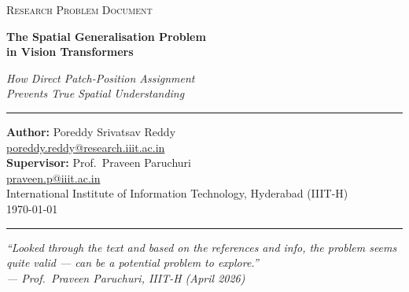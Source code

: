 \documentclass[12pt,a4paper]{article}
\begin{document}
\begin{titlepage}
  \centering
  \vspace*{1cm}
  {\small\scshape\color{gray} Research Problem Document\par}
  \vspace{0.6cm}
  {\LARGE\bfseries\color{navyblue}
    The Spatial Generalisation Problem\\[6pt]
    in Vision Transformers\par}
  \vspace{0.5cm}
  {\large\itshape\color{midblue}
    How Direct Patch-Position Assignment\\
    Prevents True Spatial Understanding\par}
  \vspace{0.8cm}
  \textcolor{gray}{\rule{0.6\linewidth}{0.4pt}}
  \vspace{0.6cm}

  {\normalsize
    \textbf{Author:} Poreddy Srivatsav Reddy\\[4pt]
    \href{mailto:poreddy.reddy@research.iiit.ac.in}%
         {poreddy.reddy@research.iiit.ac.in}\\[8pt]
    \textbf{Supervisor:} Prof.\ Praveen Paruchuri\\[4pt]
    \href{mailto:praveen.p@iiit.ac.in}{praveen.p@iiit.ac.in}\\[8pt]
    International Institute of Information Technology, Hyderabad (IIIT-H)\\[12pt]
    \today
  }

  \vspace{1cm}
  \textcolor{gray}{\rule{0.6\linewidth}{0.4pt}}
  \vspace{0.8cm}

  \begin{minipage}{0.82\linewidth}
    \small\itshape\centering
    ``Looked through the text and based on the references and info, the problem
    seems quite valid --- can be a potential problem to explore.''\\[4pt]
    \normalfont\small --- Prof.\ Praveen Paruchuri, IIIT-H (April 2026)
  \end{minipage}
\end{titlepage}

\tableofcontents
\newpage

\end{document}
